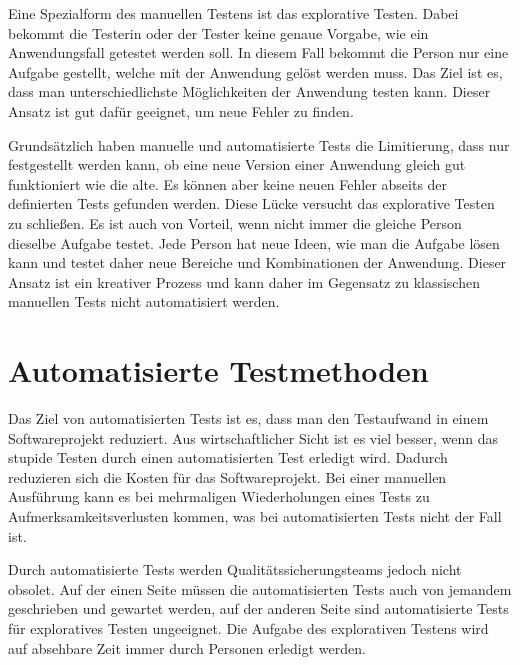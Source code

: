 
\SuperPar

Eine Spezialform des manuellen Testens ist das explorative Testen. Dabei bekommt die Testerin oder der Tester keine genaue Vorgabe, wie ein Anwendungsfall getestet werden soll. In diesem Fall bekommt die Person nur eine Aufgabe gestellt, welche mit der Anwendung gelöst werden muss. Das Ziel ist es, dass man unterschiedlichste Möglichkeiten der Anwendung testen kann. Dieser Ansatz ist gut dafür geeignet, um neue Fehler zu finden. 

\SuperPar
Grundsätzlich haben manuelle und automatisierte Tests die Limitierung, dass nur festgestellt werden kann, ob eine neue Version einer Anwendung gleich gut funktioniert wie die alte. Es können aber keine neuen Fehler abseits der definierten Tests gefunden werden. Diese Lücke versucht das explorative Testen zu schließen. Es ist auch von Vorteil, wenn nicht immer die gleiche Person dieselbe Aufgabe testet. Jede Person hat neue Ideen, wie man die Aufgabe lösen kann und testet daher neue Bereiche und Kombinationen der Anwendung. Dieser Ansatz ist ein kreativer Prozess und kann daher im Gegensatz zu klassischen manuellen Tests nicht automatisiert werden.

\section{Automatisierte Testmethoden}

Das Ziel von automatisierten Tests ist es, dass man den Testaufwand in einem Softwareprojekt reduziert. Aus wirtschaftlicher Sicht ist es viel besser, wenn das stupide Testen durch einen automatisierten Test erledigt wird. Dadurch reduzieren sich die Kosten für das Softwareprojekt. Bei einer manuellen Ausführung kann es bei mehrmaligen Wiederholungen eines Tests zu Aufmerksamkeitsverlusten kommen, was bei automatisierten Tests nicht der Fall ist.

\SuperPar
Durch automatisierte Tests werden Qualitätssicherungsteams jedoch nicht obsolet. Auf der einen Seite müssen die automatisierten Tests auch von jemandem geschrieben und gewartet werden, auf der anderen Seite sind automatisierte Tests für exploratives Testen ungeeignet. Die Aufgabe des explorativen Testens wird auf absehbare Zeit immer durch Personen erledigt werden.

